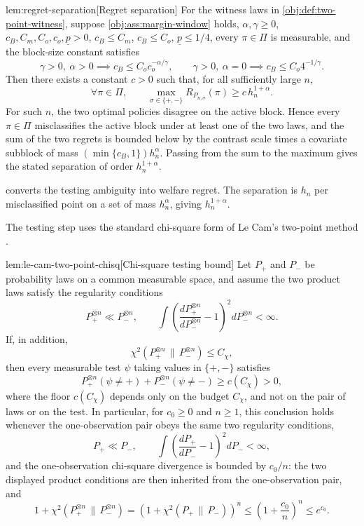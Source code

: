 \begin{lemmav}{lem:regret-separation}[Regret separation]
For the witness laws in \cref{obj:def:two-point-witness}, suppose \cref{obj:ass:margin-window} holds, \(\alpha,\gamma\ge0\), \(c_B,C_m,C_o,c_o,\underline p>0\), \(c_B\le C_m\), \(c_B\le C_o\), \(\underline p\le 1/4\), every \(\pi\in\Pi\) is measurable, and the block-size constant satisfies
\[
\gamma>0,\ \alpha>0 \implies c_B\le C_o c_o^{-\alpha/\gamma},
\qquad
\gamma>0,\ \alpha=0 \implies c_B\le C_o 4^{-1/\gamma}.
\]
Then there exists a constant \(c>0\) such that, for all sufficiently large \(n\),
\[
\forall\pi\in\Pi,\qquad
\max_{\sigma\in\{+,-\}}
R_{P_{n,\sigma}}(\pi)
\ge
c\,h_n^{1+\alpha}.
\]
For such \(n\), the two optimal policies disagree on the active block. Hence every \(\pi\in\Pi\) misclassifies the active block under at least one of the two laws, and the sum of the two regrets is bounded below by the contrast scale times a covariate subblock of mass \((\min\{c_B,1\})h_n^\alpha\). Passing from the sum to the maximum gives the stated separation of order \(h_n^{1+\alpha}\).
\end{lemmav}

 converts the testing ambiguity into welfare regret.  The separation is \(h_n\) per misclassified point on a set of mass \(h_n^\alpha\), giving \(h_n^{1+\alpha}\).

The testing step uses the standard chi-square form of Le Cam's two-point method \citep{LeCam1986,Tsybakov2009}.

\begin{lemmav}{lem:le-cam-two-point-chisq}[Chi-square testing bound]
Let \(P_+\) and \(P_-\) be probability laws on a common measurable space, and assume the two product laws satisfy the regularity conditions
\[
P_+^{\otimes n}\ll P_-^{\otimes n},
\qquad
\int \left(\frac{dP_+^{\otimes n}}{dP_-^{\otimes n}}-1\right)^2
  dP_-^{\otimes n}<\infty.
\]
If, in addition,
\[
\chi^2(P_+^{\otimes n}\,\|\,P_-^{\otimes n})\le C_\chi,
\]
then every measurable test \(\psi\) taking values in \(\{+,-\}\) satisfies
\[
P_+^{\otimes n}(\psi\ne +)
+
P_-^{\otimes n}(\psi\ne -)
\ge
c(C_\chi)>0,
\]
where the floor \(c(C_\chi)\) depends only on the budget \(C_\chi\), and not on the pair of laws or on the test.
In particular, for \(c_0\ge 0\) and \(n\ge 1\), this conclusion holds whenever the one-observation pair obeys the same two regularity conditions,
\[
P_+\ll P_-,
\qquad
\int \left(\frac{dP_+}{dP_-}-1\right)^2 dP_-<\infty,
\]
and the one-observation chi-square divergence is bounded by \(c_0/n\): the two displayed product conditions are then inherited from the one-observation pair, and
\[
1+\chi^2(P_+^{\otimes n}\,\|\,P_-^{\otimes n})
=
\left(1+\chi^2(P_+\,\|\,P_-)\right)^n
\le
\left(1+\frac{c_0}{n}\right)^n
\le e^{c_0}.
\]
\end{lemmav}


